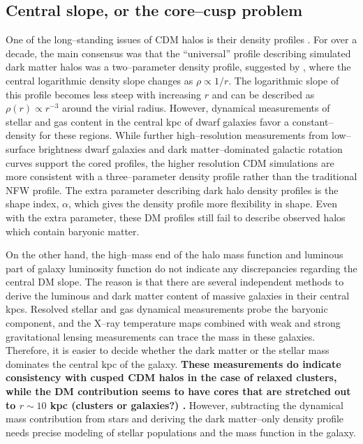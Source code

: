 \documentclass[a4wide,12pt]{book}
\newcommand{\ignore}[1]{}
\begin{document}
{\subsection{Central slope, or the core--cusp problem}
\label{subsec:core-cusp}
One of the long--standing issues of CDM halos is their density profiles \citep[][]{Dubinski.Carlberg1991, Walker.Penarrubia2011}. For over a decade, the main consensus was that the ``universal'' profile describing simulated dark matter halos was a two--parameter density profile, suggested by \citet[][ hereafter NFW]{NFW}, where the central logarithmic density slope changes as $\rho \propto 1/r$. The logarithmic slope of this profile becomes less steep with increasing $r$ and can be described as $\rho(r) \propto r^{-3}$ around the virial radius. However, dynamical measurements of stellar and gas content in the central kpc of dwarf galaxies \citep[][]{} favor a constant--density for these regions. While further high--resolution measurements from low--surface brightness dwarf galaxies and dark matter--dominated galactic rotation curves support the cored profiles, the higher resolution CDM simulations are more consistent with a three--parameter density profile rather than the traditional NFW profile. The extra parameter describing dark halo density profiles is the shape index, $\alpha$, which gives the density profile more flexibility in shape. Even with the extra parameter, these DM profiles still fail to describe observed halos which contain baryonic matter. 

On the other hand, the high--mass end of the halo mass function and luminous part of galaxy luminosity function do not indicate any discrepancies regarding the central DM slope. The reason is that there are several independent methods to derive the luminous and dark matter content of massive galaxies in their central kpcs. Resolved stellar and gas dynamical measurements probe the baryonic component\ignore{ \citep[][]{}}, and the X--ray temperature maps combined with weak and strong gravitational lensing measurements can trace the mass in these galaxies\ignore{ \citep[][]{}}. Therefore, it is easier to decide whether the dark matter or the stellar mass dominates the central kpc of the galaxy. {\bf These measurements do indicate consistency with cusped CDM halos in the case of relaxed clusters, while the DM contribution seems to have cores that are stretched out to $r\sim 10$ kpc (clusters or galaxies?) \citep[][]{}.} %
 However, subtracting the dynamical mass contribution from stars and deriving the dark matter--only density profile needs precise modeling of stellar populations and the mass function in the galaxy. 

}
\end{document}
